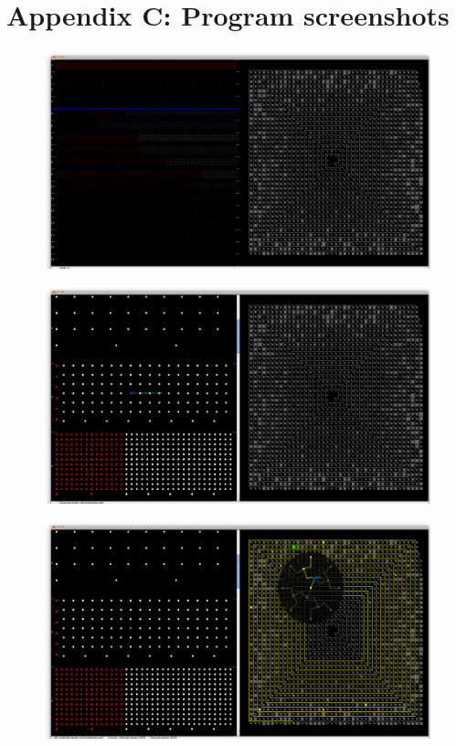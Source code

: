 \section*{Appendix C: Program screenshots}
\label{sec:appendix_C}

\begin{figure}[h!]
\centering
\includegraphics[scale=0.29, angle=90]{pictures/screenshot_1.png}
\end{figure}

\newpage
\begin{figure}[h!]
\centering
\includegraphics[scale=0.29, angle=90]{pictures/screenshot_2.png}
\end{figure}

\newpage
\begin{figure}[h!]
\centering
\includegraphics[scale=0.29, angle=90]{pictures/screenshot_3.png}
\end{figure}

